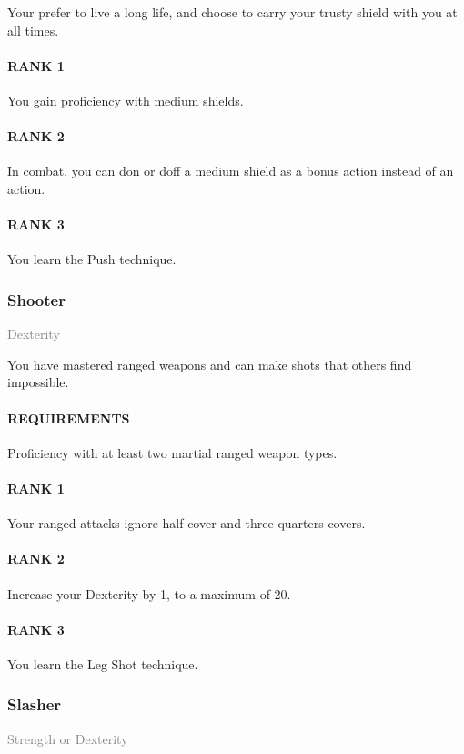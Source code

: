 \normalsize
Your prefer to live a long life, and choose to carry your trusty shield with you at all times.
\paragraph{RANK 1} You gain proficiency with medium shields.
\paragraph{RANK 2} In combat, you can don or doff a medium shield as a bonus action instead of an action.
\paragraph{RANK 3} You learn the Push technique.

\subsubsection{Shooter} \label{feat::shooter}
\small{\textcolor{gray}{Dexterity}}

\normalsize
You have mastered ranged weapons and can make shots that others find impossible.
\paragraph{REQUIREMENTS} Proficiency with at least two martial ranged weapon types.
\paragraph{RANK 1} Your ranged attacks ignore half cover and three-quarters covers.
\paragraph{RANK 2} Increase your Dexterity by 1, to a maximum of 20.
\paragraph{RANK 3} You learn the Leg Shot technique.

\subsubsection{Slasher} \label{feat::slasher}
\small{\textcolor{gray}{Strength or Dexterity}}


